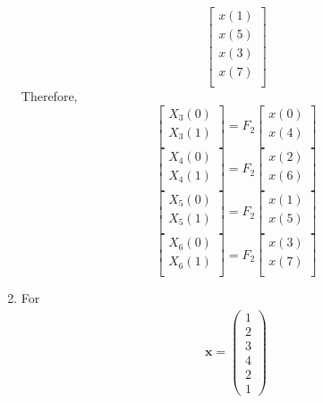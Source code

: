 \documentclass[journal,12pt,twocolumn]{IEEEtran}
\let\vec\mathbf
\numberwithin{equation}{section}
\renewcommand\thesection{\arabic{section}}
\newcommand{\myvec}[1]{\ensuremath{\begin{pmatrix}#1\end{pmatrix}}}
\begin{document}
\begin{enumerate}[label=\arabic*.,ref=\thesection.\theenumi]
\begin{equation}
\begin{bmatrix}
x(1) \\ 
x(5) \\ 
x(3) \\ 
x(7) \\
\end{bmatrix}
\end{equation}
Therefore,
\begin{equation}
\begin{bmatrix}
X_{3}(0) \\ 
X_{3}(1)\\ 
\end{bmatrix}
= F_{2}
\begin{bmatrix}
x(0) \\ 
x(4) \\ 
\end{bmatrix}
\end{equation}
\begin{equation}
\begin{bmatrix}
X_{4}(0) \\ 
X_{4}(1)\\ 
\end{bmatrix}
= F_{2}
\begin{bmatrix}
x(2) \\ 
x(6) \\ 
\end{bmatrix}
\end{equation}
\begin{equation}
\begin{bmatrix}
X_{5}(0) \\ 
X_{5}(1)\\ 
\end{bmatrix}
= F_{2}
\begin{bmatrix}
x(1) \\ 
x(5) \\ 
\end{bmatrix}
\end{equation}
\begin{equation}
\begin{bmatrix}
X_{6}(0) \\ 
X_{6}(1)\\ 
\end{bmatrix}
= F_{2}
\begin{bmatrix}
x(3) \\ 
x(7) \\ 
\end{bmatrix}
\end{equation}
\item For 
    \begin{align}
	    \vec{x} = \myvec{1\\2\\3\\4\\2\\1}

\end{align}
\end{enumerate}
\end{document}
